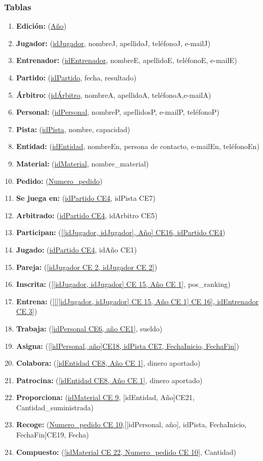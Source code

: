\subsubsection{Tablas}
\begin{enumerate}
	\item \textbf{Edición: } (\underline{Año})
	\item \textbf{Jugador: } (\underline{idJugador}, nombreJ, apellidoJ, teléfonoJ, e-mailJ)
	\item \textbf{Entrenador: } (\underline{idEntrenador}, nombreE, apellidoE, teléfonoE, e-mailE)
	\item \textbf{Partido: } (\underline{idPartido}, fecha, resultado)
	\item \textbf{Árbitro: } (\underline{idÁrbitro}, nombreA, apellidoA, teléfonoA,e-mailA)
	\item \textbf{Personal: } (\underline{idPersonal}, nombreP, apellidosP, e-mailP, teléfonoP)
	\item \textbf{Pista: } (\underline{idPista}, nombre, capacidad)
	\item \textbf{Entidad: } (\underline{idEntidad}, nombreEn, persona de contacto, e-mailEn, teléfonoEn)
	\item \textbf{Material: } (\underline{idMaterial}, nombre\_material)
	\item \textbf{Pedido: } (\underline{Numero\_pedido})
\newline
	\item \textbf{Se juega en: } (\underline{idPartido CE4}, idPista CE7)
	\item \textbf{Arbitrado: } (\underline{idPartido CE4}, idArbitro CE5)
	\item \textbf{Participan: } (\underline{[[idJugador, idJugador], Año] CE16, idPartido CE4})
	\item \textbf{Jugado: } (\underline{idPartido CE4}, idAño CE1)
	\item \textbf{Pareja: } (\underline{[idJugador CE 2, idJugador CE 2]})
	\item \textbf{Inscrita: } (\underline{[[idJugador, idJugador] CE 15, Año CE 1]}, pos\_ranking)
	\item \textbf{Entrena: } (\underline{[[[[idJugador, idJugador] CE 15, Año CE 1] CE 16], idEntrenador CE 3]})
	\item \textbf{Trabaja: } (\underline{[idPersonal CE6, año CE1]}, sueldo)
	\item \textbf{Asigna: } (\underline{[[idPersonal, año]CE18, idPista CE7, FechaInicio, FechaFin]})
	\item \textbf{Colabora: } (\underline{[idEntidad CE8, Año CE 1]}, dinero aportado)
	\item \textbf{Patrocina: } (\underline{[idEntidad CE8, Año CE 1]}, dinero aportado)
	\item \textbf{Proporciona: } (\underline{idMaterial CE 9}, [idEntidad, Año]CE21, Cantidad\_suministrada)
	\item \textbf{Recoge: } (\underline{Numero\_pedido CE 10},[[idPersonal, año], idPista, FechaInicio, FechaFin]CE19, Fecha)
	\item \textbf{Compuesto: } (\underline{[idMaterial CE 22, Numero\_pedido CE 10]}, Cantidad)
\end{enumerate}

